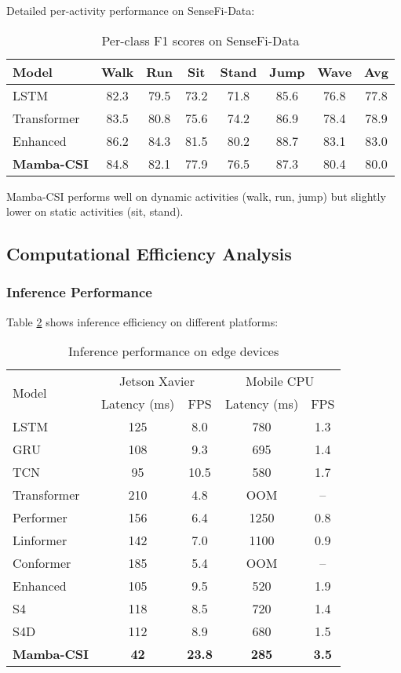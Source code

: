 \documentclass[10pt,journal,compsoc]{IEEEtran}
\begin{document}
Detailed per-activity performance on SenseFi-Data:

\begin{table}[h]
\centering
\caption{Per-class F1 scores on SenseFi-Data}
\label{tab:per_class}
\begin{tabular}{lccccccc}
\toprule
Model & Walk & Run & Sit & Stand & Jump & Wave & Avg \\
\midrule
LSTM & 82.3 & 79.5 & 73.2 & 71.8 & 85.6 & 76.8 & 77.8 \\
Transformer & 83.5 & 80.8 & 75.6 & 74.2 & 86.9 & 78.4 & 78.9 \\
Enhanced & 86.2 & 84.3 & 81.5 & 80.2 & 88.7 & 83.1 & 83.0 \\
\textbf{Mamba-CSI} & 84.8 & 82.1 & 77.9 & 76.5 & 87.3 & 80.4 & 80.0 \\
\bottomrule
\end{tabular}
\end{table}

Mamba-CSI performs well on dynamic activities (walk, run, jump) but slightly lower on static activities (sit, stand).

\subsection{Computational Efficiency Analysis}

\subsubsection{Inference Performance}

Table \ref{tab:inference} shows inference efficiency on different platforms:

\begin{table}[h]
\centering
\caption{Inference performance on edge devices}
\label{tab:inference}
\begin{tabular}{lcccc}
\toprule
\multirow{2}{*}{Model} & \multicolumn{2}{c}{Jetson Xavier} & \multicolumn{2}{c}{Mobile CPU} \\
\cmidrule(lr){2-3} \cmidrule(lr){4-5}
 & Latency (ms) & FPS & Latency (ms) & FPS \\
\midrule
LSTM & 125 & 8.0 & 780 & 1.3 \\
GRU & 108 & 9.3 & 695 & 1.4 \\
TCN & 95 & 10.5 & 580 & 1.7 \\
\midrule
Transformer & 210 & 4.8 & OOM & -- \\
Performer & 156 & 6.4 & 1250 & 0.8 \\
Linformer & 142 & 7.0 & 1100 & 0.9 \\
\midrule
Conformer & 185 & 5.4 & OOM & -- \\
Enhanced & 105 & 9.5 & 520 & 1.9 \\
\midrule
S4 & 118 & 8.5 & 720 & 1.4 \\
S4D & 112 & 8.9 & 680 & 1.5 \\
\midrule
\textbf{Mamba-CSI} & \textbf{42} & \textbf{23.8} & \textbf{285} & \textbf{3.5} \\
\bottomrule
\end{tabular}
\end{table}
\end{document}
